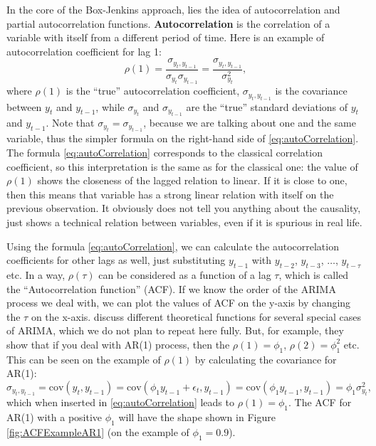 \documentclass[
]{book}
\theoremstyle{definition}
\theoremstyle{definition}
\theoremstyle{definition}
\theoremstyle{definition}
\theoremstyle{remark}
\begin{document}
In the core of the Box-Jenkins approach, lies the idea of autocorrelation and partial autocorrelation functions. \textbf{Autocorrelation} is the correlation \citep[see Section 6.3 of][]{SvetunkovSBA} of a variable with itself from a different period of time. Here is an example of autocorrelation coefficient for lag 1:
\begin{equation}
  \rho(1) = \frac{\sigma_{y_t,y_{t-1}}}{\sigma_{y_t}\sigma_{y_{t-1}}} = \frac{\sigma_{y_t,y_{t-1}}}{\sigma_{y_t}^2},
  \label{eq:autoCorrelation}
\end{equation}
where \(\rho(1)\) is the ``true'' autocorrelation coefficient, \(\sigma_{y_t,y_{t-1}}\) is the covariance between \(y_t\) and \(y_{t-1}\), while \(\sigma_{y_t}\) and \(\sigma_{y_{t-1}}\) are the ``true'' standard deviations of \(y_t\) and \(y_{t-1}\). Note that \(\sigma_{y_t}=\sigma_{y_{t-1}}\), because we are talking about one and the same variable, thus the simpler formula on the right-hand side of \eqref{eq:autoCorrelation}. The formula \eqref{eq:autoCorrelation} corresponds to the classical correlation coefficient, so this interpretation is the same as for the classical one: the value of \(\rho(1)\) shows the closeness of the lagged relation to linear. If it is close to one, then this means that variable has a strong linear relation with itself on the previous observation. It obviously does not tell you anything about the causality, just shows a technical relation between variables, even if it is spurious in real life.

Using the formula \eqref{eq:autoCorrelation}, we can calculate the autocorrelation coefficients for other lags as well, just substituting \(y_{t-1}\) with \(y_{t-2}\), \(y_{t-3}\), \(\dots\), \(y_{t-\tau}\) etc. In a way, \(\rho(\tau)\) can be considered as a function of a lag \(\tau\), which is called the ``Autocorrelation function'' (ACF). If we know the order of the ARIMA process we deal with, we can plot the values of ACF on the y-axis by changing the \(\tau\) on the x-axis. \citet{Box1976} discuss different theoretical functions for several special cases of ARIMA, which we do not plan to repeat here fully. But, for example, they show that if you deal with AR(1) process, then the \(\rho(1)=\phi_1\), \(\rho(2)=\phi_1^2\) etc. This can be seen on the example of \(\rho(1)\) by calculating the covariance for AR(1):
\begin{equation}
  \sigma_{y_t,y_{t-1}} = \mathrm{cov}(y_t,y_{t-1}) = \mathrm{cov}(\phi_1 y_{t-1} + \epsilon_t, y_{t-1}) = \mathrm{cov}(\phi_1 y_{t-1}, y_{t-1}) = \phi_1 \sigma_{y_t}^2 ,
  \label{eq:autoCovarianceAR1}
\end{equation}
which when inserted in \eqref{eq:autoCorrelation} leads to \(\rho(1)=\phi_1\). The ACF for AR(1) with a positive \(\phi_1\) will have the shape shown in Figure \ref{fig:ACFExampleAR1} (on the example of \(\phi_1=0.9\)).
\end{document}
